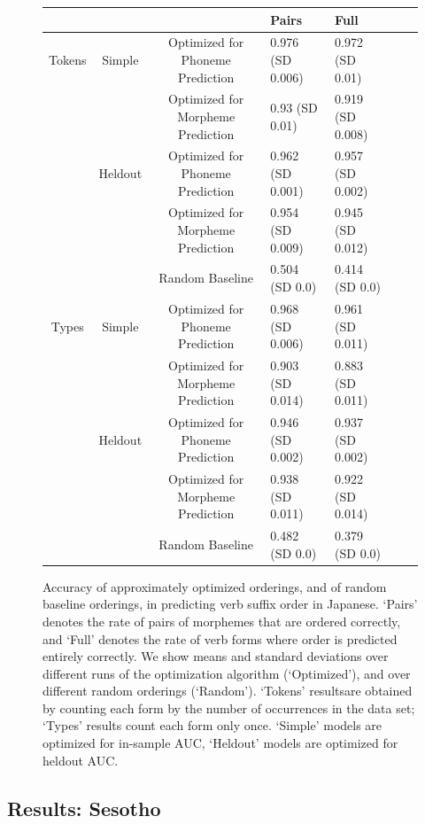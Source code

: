 \documentclass[11pt,letterpaper]{article}
\begin{document}
\begin{figure}
\begin{center}
\begin{tabular}{ccc||llll}
	& &              &       Pairs & Full \\ \hline\hline
	Tokens &	Simple & Optimized for Phoneme Prediction   &   0.976 (SD 0.006) & 0.972 (SD 0.01) \\
	&	& Optimized for Morpheme Prediction  &   0.93 (SD 0.01) & 0.919 (SD 0.008) \\ \hline
	&	Heldout & Optimized for Phoneme Prediction   &   0.962 (SD 0.001) & 0.957 (SD 0.002) \\
	&	& Optimized for Morpheme Prediction  &   0.954 (SD 0.009) & 0.945 (SD 0.012) \\ \hline
	&	&	Random Baseline    &  0.504 (SD 0.0) & 0.414 (SD 0.0) \\ \hline \hline
	Types & Simple & Optimized for Phoneme Prediction   &   0.968 (SD 0.006) & 0.961 (SD 0.011) \\
	& & Optimized for Morpheme Prediction  &   0.903 (SD 0.014) & 0.883 (SD 0.011) \\ \hline
	& Heldout & Optimized for Phoneme Prediction   &   0.946 (SD 0.002) & 0.937 (SD 0.002) \\
	& & Optimized for Morpheme Prediction  &   0.938 (SD 0.011) & 0.922 (SD 0.014) \\ \hline
	& & Random Baseline    &  0.482 (SD 0.0) & 0.379 (SD 0.0) \\
\end{tabular}
\end{center}
\caption{Accuracy of approximately optimized orderings, and of random baseline orderings, in predicting verb suffix order in Japanese. `Pairs' denotes the rate of pairs of morphemes that are ordered correctly, and `Full' denotes the rate of verb forms where order is predicted entirely correctly. We show means and standard deviations over different runs of the optimization algorithm (`Optimized'), and over different random orderings (`Random'). `Tokens' resultsare obtained by counting each form by the number of occurrences in the data set; `Types' results count each form only once. `Simple' models are optimized for in-sample AUC, `Heldout' models are optimized for heldout AUC.}\label{fig:acc-japanese}
\end{figure}



\subsection{Results: Sesotho}
\end{document}
